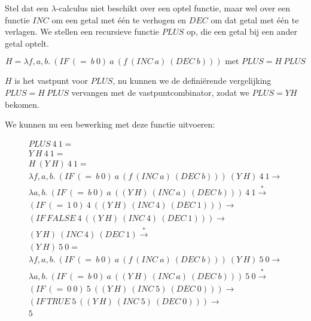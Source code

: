 Stel dat een $\lambda$-calculus niet beschikt over een optel functie, maar wel over een functie $INC$ om een getal met \'e\'en te verhogen en $DEC$ om dat getal met \'e\'en te verlagen. We stellen een recursieve functie $PLUS$ op, die een getal bij een ander getal optelt.

\begin{equation*}
  H = \lambda f,a,b.\ (IF\ (=\ b\ 0)\ a\ (f\ (INC\ a)\ (DEC\ b))) \text{ met } PLUS = H\ PLUS
\end{equation*}

$H$ is het vastpunt voor $PLUS$, nu kunnen we de defini\"erende vergelijking $PLUS = H\ PLUS$ vervangen met de vastpuntcombinator, zodat we $PLUS = Y H$ bekomen.

We kunnen nu een bewerking met deze functie uitvoeren:

\begin{equation*}
\begin{aligned}
PLUS\ 4\ 1 = \\
Y\ H\ 4\ 1 = \\
H\ (Y\ H)\ 4\ 1 = \\
\lambda f,a,b.\ (IF\ (=\ b\ 0)\ a\ (f\ (INC\ a)\ (DEC\ b)))\ (Y\ H)\ 4\ 1 \longrightarrow \\
\lambda a,b.\ (IF\ (=\ b\ 0)\ a\ ((Y\ H)\ (INC\ a)\ (DEC\ b)))\ 4\ 1 \stackrel{*}{\longrightarrow} \\
(IF\ (=\ 1\ 0)\ 4\ ((Y\ H)\ (INC\ 4)\ (DEC\ 1))) \longrightarrow \\
(IF\ FALSE\ 4\ ((Y\ H)\ (INC\ 4)\ (DEC\ 1))) \longrightarrow \\
(Y\ H)\ (INC\ 4)\ (DEC\ 1) \stackrel{*}{\longrightarrow} \\
(Y\ H)\ 5\ 0 = \\
\lambda f,a,b.\ (IF\ (=\ b\ 0)\ a\ (f\ (INC\ a)\ (DEC\ b)))\ (Y\ H)\ 5\ 0 \longrightarrow \\
\lambda a,b.\ (IF\ (=\ b\ 0)\ a\ ((Y\ H)\ (INC\ a)\ (DEC\ b)))\ 5\ 0 \stackrel{*}{\longrightarrow} \\
(IF\ (=\ 0\ 0)\ 5\ ((Y\ H)\ (INC\ 5)\ (DEC\ 0))) \longrightarrow \\
(IF\ TRUE\ 5\ ((Y\ H)\ (INC\ 5)\ (DEC\ 0))) \longrightarrow \\
5
\end{aligned}
\end{equation*}